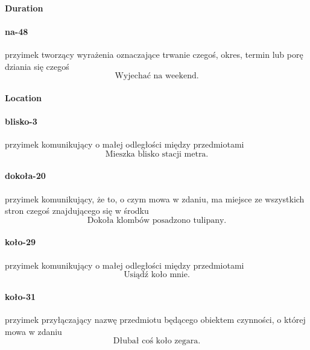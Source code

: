 \documentclass[a4paper, 12pt]{article}
\theoremstyle{remark}
\begin{document}
\paragraph{Duration} %
\label{sub:duration}
\paragraph{na-48} \label{prep-48}	przyimek tworzący wyrażenia oznaczające trwanie czegoś, okres, termin lub porę dziania się czegoś
\begin{equation}
\text{Wyjechać na weekend.}
\end{equation}

\paragraph{Location} %
\label{sub:location}
\paragraph{blisko-3} \label{prep-3}	przyimek komunikujący o małej odległości między przedmiotami
\begin{equation}
\text{Mieszka blisko stacji metra.}
\end{equation}
\paragraph{dokoła-20} \label{prep-20}	przyimek komunikujący, że to, o czym mowa w zdaniu, ma miejsce ze wszystkich stron czegoś znajdującego się w środku
\begin{equation}
\text{Dokoła klombów posadzono tulipany.}
\end{equation}
\paragraph{koło-29} \label{prep-29}	przyimek komunikujący o małej odległości między przedmiotami
\begin{equation}
\text{Usiądź koło mnie.}
\end{equation}
\paragraph{koło-31} \label{prep-31}	przyimek przyłączający nazwę przedmiotu będącego obiektem czynności, o której mowa w zdaniu
\begin{equation}
\text{Dłubał coś koło zegara.}
\end{equation}
\end{document}
